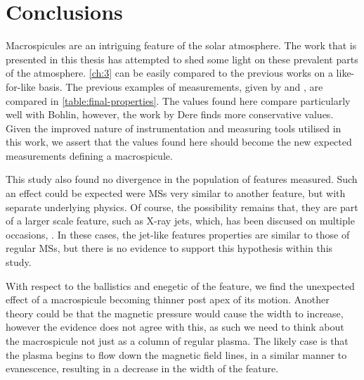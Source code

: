 
\label{ch:conc}
\chapter{Conclusions}

Macrospicules are an intriguing feature of the solar atmosphere.
The work that is presented in this thesis has attempted to shed some light on these prevalent parts of the atmosphere.
\cref{ch:3} can be easily compared to the previous works on a like-for-like basis.
The previous examples of measurements, given by \cite{Bohlin1975} and \cite{Dere89}, are compared in \cref{table:final-properties}.
The values found here compare particularly well with Bohlin, however, the work by Dere finds more conservative values.
Given the improved nature of instrumentation and measuring tools utilised in this work, we assert that the values found here should become the new expected measurements defining a macrospicule.

This study also found no divergence in the population of features measured.
Such an effect could be expected were MSs very similar to another feature, but with separate underlying physics.
Of course, the possibility remains that, they are part of a larger scale feature, such as X-ray jets, which, has been discused on multiple occasions, \cite{Parenti2002, Kamio2010}.
In these cases, the jet-like features properties are similar to those of regular MSs, but there is no evidence to support this hypothesis within this study.   

With respect to the ballistics and enegetic of the feature, we find the unexpected effect of a macrospicule becoming thinner post apex of its motion.
Another theory could be that the magnetic pressure would cause the width to increase, however the evidence does not agree with this, as such we need to think about the macrospicule not just as a column of regular plasma.
The likely case is that the plasma begins to flow down the magnetic field lines, in a similar manner to evanescence, resulting in a decrease in the width of the feature.


